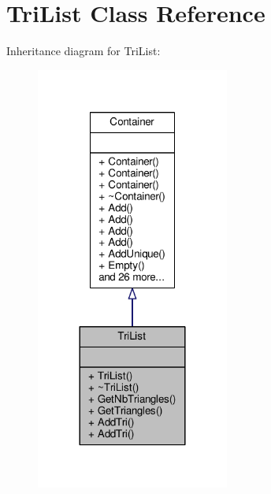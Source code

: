 \hypertarget{classTriList}{}\section{Tri\+List Class Reference}
\label{classTriList}


Inheritance diagram for Tri\+List\+:
\nopagebreak
\begin{figure}[H]
\begin{center}
\leavevmode
\includegraphics[width=180pt]{da/d6c/classTriList__inherit__graph}
\end{center}
\end{figure}


